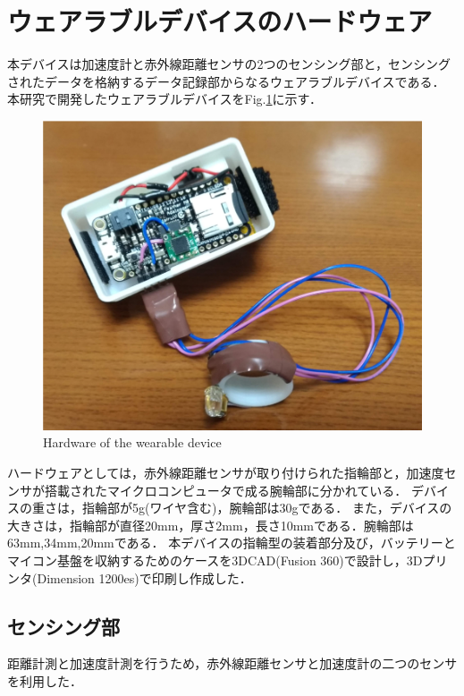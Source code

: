 \section{ウェアラブルデバイスのハードウェア}
本デバイスは加速度計と赤外線距離センサの2つのセンシング部と，センシングされたデータを格納するデータ記録部からなるウェアラブルデバイスである．
本研究で開発したウェアラブルデバイスをFig.\ref{fig:device}に示す．
\begin{figure}[H]
  \centering
  \includegraphics[width=0.8\linewidth]{fig/fal6}
  \caption{Hardware of the wearable device}
  \label{fig:device}
\end{figure}
ハードウェアとしては，赤外線距離センサが取り付けられた指輪部と，加速度センサが搭載されたマイクロコンピュータで成る腕輪部に分かれている．
デバイスの重さは，指輪部が5g(ワイヤ含む)，腕輪部は30gである．
また，デバイスの大きさは，指輪部が直径20mm，厚さ2mm，長さ10mmである．腕輪部は63mm,34mm,20mmである．
本デバイスの指輪型の装着部分及び，バッテリーとマイコン基盤を収納するためのケースを3DCAD(Fusion 360)で設計し，3Dプリンタ(Dimension 1200es)で印刷し作成した．


\subsection*{センシング部}
距離計測と加速度計測を行うため，赤外線距離センサと加速度計の二つのセンサを利用した．
